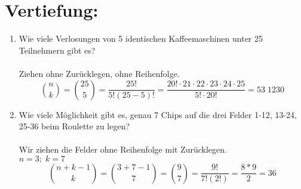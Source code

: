 



	\maketitle
	\section*{Vertiefung:}
	\begin{enumerate}[label=(\alph*)]
		\item  Wie viele Verlosungen von 5 identischen Kaffeemaschinen unter 25 Teilnehmern gibt es? \\
		\\Ziehen ohne Zurücklegen, ohne Reihenfolge.\\	
		$${n \choose k}= {25 \choose 5}= \frac{25!}{5!(25-5)!}= \frac{20!\cdot 21 \cdot 22 \cdot 23 \cdot 24 \cdot 25}{5! \cdot 20!} = 53 \; 1230 $$
		\item Wie viele Möglichkeit gibt es, genau 7 Chips auf die drei Felder 1-12, 13-24, 25-36 beim Roulette zu legen?
		\\
		\\ 
		Wir ziehen die Felder ohne Reihenfolge mit Zur\"ucklegen.\\
		$n=3; \; k=7$ \\
		$$ \binom{n+k-1}{k}= \binom{3+7-1}{7}= \binom{9}{7}=
		\frac{9!}{7!(2!)}= \frac{8*9}{2}=36 $$
		
	\end{enumerate}

